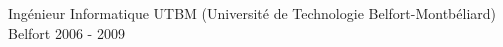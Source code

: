\begin{cventries}
  \cventry
    {Ingénieur Informatique}
    {UTBM (Université de Technologie Belfort-Montbéliard)}
    {Belfort}
    {2006 - 2009}
    {}
\end{cventries}
